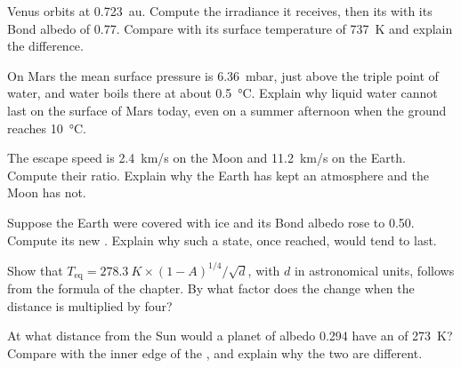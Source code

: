 \begin{exercise}[$\star\star$]\label{exo:g10:habitable-planet:8}
Venus orbits at \qty{0.723}{au}. Compute the irradiance it receives, then its
 with its Bond albedo of 0.77. Compare with its
surface temperature of \qty{737}{K} and explain the difference.
\end{exercise}

\begin{exercise}[$\star\star$]\label{exo:g10:habitable-planet:9}
On Mars the mean surface pressure is \qty{6.36}{mbar}, just above the triple
point of water, and water boils there at about \qty{0.5}{\degreeCelsius}.
Explain why liquid water cannot last on the surface of Mars today, even on a
summer afternoon when the ground reaches \qty{10}{\degreeCelsius}.
\end{exercise}

\begin{exercise}[$\star\star$]\label{exo:g10:habitable-planet:10}
The escape speed is \qty{2.4}{km/s} on the Moon and \qty{11.2}{km/s} on the
Earth. Compute their ratio. Explain why the Earth has kept an atmosphere and
the Moon has not.
\end{exercise}

\begin{exercise}[$\star\star$]\label{exo:g10:habitable-planet:11}
Suppose the Earth were covered with ice and its Bond albedo rose to 0.50.
Compute its new . Explain why such a state, once
reached, would tend to last.
\end{exercise}

\begin{exercise}[$\star\star\star$]\label{exo:g10:habitable-planet:12}
Show that $T_{\mathrm{eq}} = \qty{278.3}{K} \times (1-A)^{1/4}/\sqrt{d}$, with
$d$ in astronomical units, follows from the formula of the chapter. By what
factor does the  change when the distance is
multiplied by four?
\end{exercise}

\begin{exercise}[$\star\star\star$]\label{exo:g10:habitable-planet:13}
At what distance from the Sun would a planet of albedo 0.294 have an
 of \qty{273}{K}? Compare with the inner edge of the
, and explain why the two are different.
\end{exercise}

